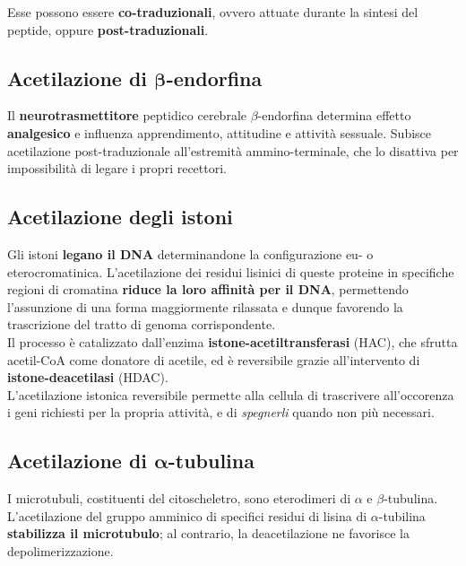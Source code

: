 \documentclass[a4paper, 12pt]{article}
\begin{document}
Esse possono essere \textbf{co-traduzionali}, ovvero attuate durante la sintesi del peptide, oppure \textbf{post-traduzionali}.

\subsection{Acetilazione di $\boldsymbol\beta$-endorfina}
Il \textbf{neurotrasmettitore} peptidico cerebrale $\beta$-endorfina determina effetto \textbf{analgesico} e influenza apprendimento, attitudine e attività sessuale. Subisce acetilazione post-traduzionale all'estremità ammino-terminale, che lo disattiva per impossibilità di legare i propri recettori.

\subsection{Acetilazione degli istoni}
Gli istoni \textbf{legano il DNA} determinandone la configurazione eu- o eterocromatinica. L'acetilazione dei residui lisinici di queste proteine in specifiche regioni di cromatina \textbf{riduce la loro affinità per il DNA}, permettendo l'assunzione di una forma maggiormente rilassata e dunque favorendo la trascrizione del tratto di genoma corrispondente.\\
Il processo è catalizzato dall'enzima \textbf{istone-acetiltransferasi} (HAC), che sfrutta acetil-CoA come donatore di acetile, ed è reversibile grazie all'intervento di \textbf{istone-deacetilasi} (HDAC).\\
L'acetilazione istonica reversibile permette alla cellula di trascrivere all'occorenza i geni richiesti per la propria attività, e di \textit{spegnerli} quando non più necessari.

\subsection{Acetilazione di $\boldsymbol\alpha$-tubulina}
I microtubuli, costituenti del citoscheletro, sono eterodimeri di $\alpha$ e $\beta$-tubulina.\\
L'acetilazione del gruppo amminico di specifici residui di lisina di $\alpha$-tubilina \textbf{stabilizza il microtubulo}; al contrario, la deacetilazione ne favorisce la depolimerizzazione.
\end{document}
